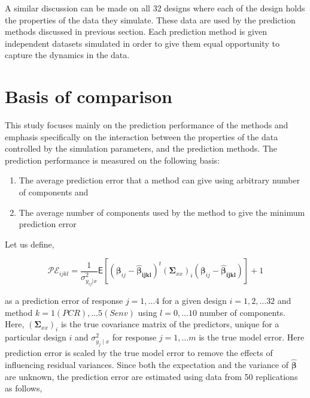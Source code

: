\documentclass[12pt,3p,authoryear]{elsarticle}
\providecommand{\tightlist}{%
  \setlength{\itemsep}{0pt}\setlength{\parskip}{0pt}}
\begin{document}
A similar discussion can be made on all 32 designs where each of the
design holds the properties of the data they simulate. These data are
used by the prediction methods discussed in previous section. Each
prediction method is given independent datasets simulated in order to
give them equal opportunity to capture the dynamics in the data.

\section{Basis of comparison}\label{basis-of-comparison}

This study focuses mainly on the prediction performance of the methods
and emphasis specifically on the interaction between the properties of
the data controlled by the simulation parameters, and the prediction
methods. The prediction performance is measured on the following basis:

\begin{enumerate}
\def\labelenumi{\alph{enumi})}
\tightlist
\item
  The average prediction error that a method can give using arbitrary
  number of components and
\item
  The average number of components used by the method to give the
  minimum prediction error
\end{enumerate}

Let us define,

\begin{equation}
\mathcal{PE}_{ijkl} = \frac{1}{\sigma_{y_{ij}|x}^2}
  \mathsf{E}{\left[\left(\boldsymbol{\beta}_{ij} - 
  \boldsymbol{\hat{\beta}_{ijkl}}\right)^t
  \left(\boldsymbol{\Sigma}_{xx}\right)_i
  \left(\boldsymbol{\beta}_{ij} - \boldsymbol{\hat{\beta}_{ijkl}}\right)\right]} + 1
\label{eq:pred-error}
\end{equation}

as a prediction error of response \(j = 1, \ldots 4\) for a given design
\(i=1, 2, \ldots 32\) and method \(k=1(PCR), \ldots 5(Senv)\) using
\(l=0, \ldots 10\) number of components. Here,
\(\left(\boldsymbol{\Sigma}_{xx}\right)_i\) is the true covariance
matrix of the predictors, unique for a particular design \(i\) and
\(\sigma_{y_j\mid x}^2\) for response \(j = 1, \ldots m\) is the true
model error. Here prediction error is scaled by the true model error to
remove the effects of influencing residual variances. Since both the
expectation and the variance of \(\hat{\boldsymbol{\beta}}\) are
unknown, the prediction error are estimated using data from 50
replications as follows,
\end{document}
